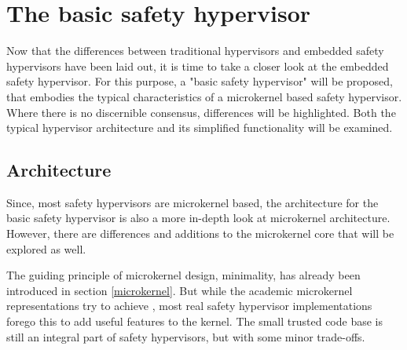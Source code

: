 
\chapter{The basic safety hypervisor} %

\label{Chapter2} %





Now that the differences between traditional hypervisors and embedded safety hypervisors have been laid out, it is time to take a closer look at the embedded safety hypervisor.
For this purpose, a "basic safety hypervisor" will be proposed, that embodies the typical characteristics of a microkernel based safety hypervisor. Where there is no discernible consensus, differences will be highlighted. Both the typical hypervisor architecture and its simplified functionality will be examined.

\section{Architecture}
Since, most safety hypervisors are microkernel based, the architecture for the basic safety hypervisor is also a more in-depth look at microkernel architecture. However, there are differences and additions to the microkernel core that will be explored as well.   

The guiding principle of microkernel design, minimality, has already been introduced in section \ref{microkernel}. But while the academic microkernel representations try to achieve , most real safety hypervisor implementations forego this to add useful features to the kernel. The small trusted code base is still an integral part of safety hypervisors, but with some minor trade-offs. 

